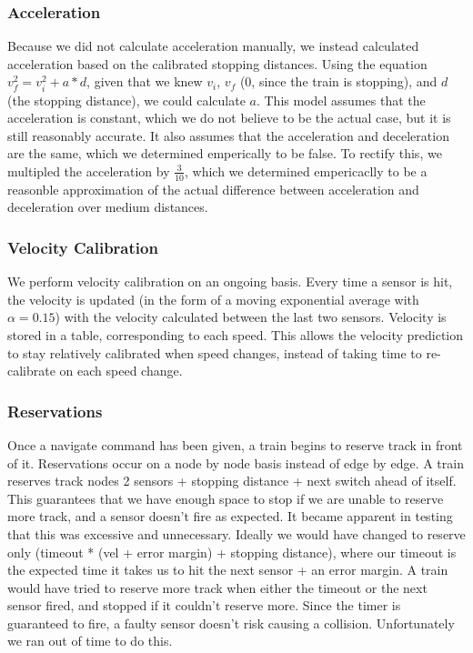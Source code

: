\documentclass{article}
\begin{document}
\subsubsection{Acceleration}
Because we did not calculate acceleration manually, we instead calculated acceleration based on the calibrated stopping distances. 
Using the equation $v_f^2 = v_i^2 + a*d$, given that we knew $v_i$, $v_f$ (0, since the train is stopping), and $d$ (the stopping distance), we could calculate $a$. 
This model assumes that the acceleration is constant, which we do not believe to be the actual case, but it is still reasonably accurate. It also assumes that the acceleration and deceleration are the same, which we determined emperically to be false.
To rectify this, we multipled the acceleration by $\frac{3}{10}$, which we determined empericaclly to be a reasonble approximation of the actual difference between acceleration and deceleration over medium distances. 

\subsubsection{ Velocity Calibration }
We perform velocity calibration on an ongoing basis. Every time a sensor is hit, the velocity is updated (in the form of a moving exponential average with $\alpha = 0.15$) with the velocity calculated between the last two sensors.
Velocity is stored in a table, corresponding to each speed. This allows the velocity prediction to stay relatively calibrated when speed changes, instead of taking time to re-calibrate on each speed change.

\subsubsection{Reservations}
Once a navigate command has been given, a train begins to reserve track in front of it. 
Reservations occur on a node by node basis instead of edge by edge. A train reserves track nodes 2 sensors + stopping distance + next switch ahead of itself.
This guarantees that we have enough space to stop if we are unable to reserve more track, and a sensor doesn't fire as expected.
It became apparent in testing that this was excessive and unnecessary.
Ideally we would have changed to reserve only (timeout * (vel + error margin) + stopping distance), where our timeout is the expected time it takes us to hit the next sensor + an error margin.
A train would have tried to reserve more track when either the timeout or the next sensor fired, and stopped if it couldn't reserve more. Since the timer is guaranteed to fire, a faulty sensor doesn't risk causing a collision.
Unfortunately we ran out of time to do this.
\end{document}
